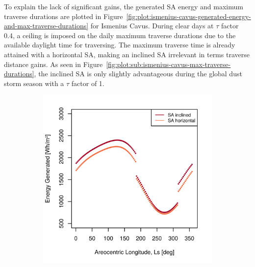 \documentclass[twocolumn,letterpaper]{IEEEAerospaceCLS}  %
\newcommand{\refFig}[1]{{Figure}~\ref{#1}} %
\newlength{\subfigureWidth}
\newlength{\graphicsHeight}
\begin{document}
To explain the lack of significant gains, the generated \ac{SA} energy and maximum traverse durations are plotted in \refFig{fig:plot:ismenius-cavus-generated-energy-and-max-traverse-durations} for Ismenius Cavus. During clear days at $\tau$ factor 0.4, a ceiling is imposed on the daily maximum traverse durations due to the available daylight time for traversing. The maximum traverse time is already attained with a horizontal \ac{SA}, making an inclined \ac{SA} irrelevant in terms traverse distance gains. As seen in \refFig{fig:plot:sub:ismenius-cavus-max-traverse-durations}, the inclined \ac{SA} is only slightly advantageous during the global dust storm season with a $\tau$ factor of 1.

\begin{figure}[h]
\captionsetup[subfigure]{justification=centering}
  \centering
  \setlength{\subfigureWidth}{0.24\textwidth}
  \setlength{\graphicsHeight}{40mm}
  \begin{subfigure}[t]{\subfigureWidth}
    \centering
    \includegraphics[height=\graphicsHeight]{figures/plots/ismeniuscavus-daily-generated-energy-for-solar-cell-coverage-area-41m2.png}
    \label{fig:plot:sub:ismenius-cavus-generated-energy}
  \end{subfigure}\hfill
  \begin{subfigure}[t]{\subfigureWidth}

\end{subfigure}
\end{figure}
\end{document}
